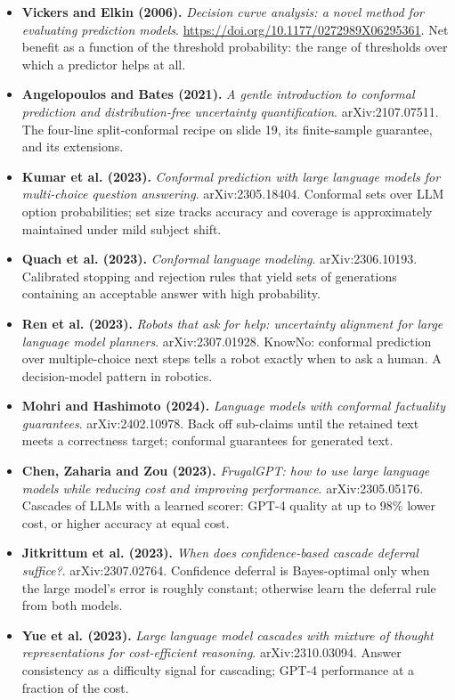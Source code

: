 \documentclass[11pt,letterpaper]{article}
\begin{document}
\begin{itemize}[leftmargin=1.2em,itemsep=3pt]
\item \textbf{Vickers and Elkin (2006).} \textit{Decision curve analysis: a novel method for evaluating prediction models}. \url{https://doi.org/10.1177/0272989X06295361}. Net benefit as a function of the threshold probability: the range of thresholds over which a predictor helps at all.
\item \textbf{Angelopoulos and Bates (2021).} \textit{A gentle introduction to conformal prediction and distribution-free uncertainty quantification}. arXiv:2107.07511. The four-line split-conformal recipe on slide 19, its finite-sample guarantee, and its extensions.
\item \textbf{Kumar et al. (2023).} \textit{Conformal prediction with large language models for multi-choice question answering}. arXiv:2305.18404. Conformal sets over LLM option probabilities; set size tracks accuracy and coverage is approximately maintained under mild subject shift.
\item \textbf{Quach et al. (2023).} \textit{Conformal language modeling}. arXiv:2306.10193. Calibrated stopping and rejection rules that yield sets of generations containing an acceptable answer with high probability.
\item \textbf{Ren et al. (2023).} \textit{Robots that ask for help: uncertainty alignment for large language model planners}. arXiv:2307.01928. KnowNo: conformal prediction over multiple-choice next steps tells a robot exactly when to ask a human. A decision-model pattern in robotics.
\item \textbf{Mohri and Hashimoto (2024).} \textit{Language models with conformal factuality guarantees}. arXiv:2402.10978. Back off sub-claims until the retained text meets a correctness target; conformal guarantees for generated text.
\item \textbf{Chen, Zaharia and Zou (2023).} \textit{FrugalGPT: how to use large language models while reducing cost and improving performance}. arXiv:2305.05176. Cascades of LLMs with a learned scorer: GPT-4 quality at up to 98\% lower cost, or higher accuracy at equal cost.
\item \textbf{Jitkrittum et al. (2023).} \textit{When does confidence-based cascade deferral suffice?}. arXiv:2307.02764. Confidence deferral is Bayes-optimal only when the large model's error is roughly constant; otherwise learn the deferral rule from both models.
\item \textbf{Yue et al. (2023).} \textit{Large language model cascades with mixture of thought representations for cost-efficient reasoning}. arXiv:2310.03094. Answer consistency as a difficulty signal for cascading; GPT-4 performance at a fraction of the cost.

\end{itemize}
\end{document}

